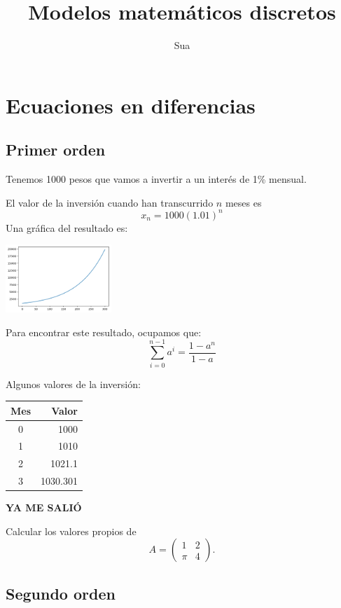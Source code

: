 \documentclass{article}
\title{Modelos matemáticos discretos}
\author{Sua}
\begin{document}
\maketitle
\section{Ecuaciones en diferencias}
\subsection{Primer orden}

Tenemos 1000 pesos que vamos a invertir a un interés de 1\% mensual.

El valor de la inversión cuando han transcurrido $n$ meses es $$x_n=1000(1.01)^n$$
Una gráfica del resultado es:

\begin{center}
\includegraphics[width=4cm]{grafica}
\end{center}

Para encontrar este resultado, ocupamos que: $$\sum_{i=0}^{n-1}a^i=\frac{1-a^n}{1-a}$$

Algunos valores de la inversión:
\begin{center}
\begin{tabular}{|c|r|}
\hline
Mes & Valor \\
\hline
0 & 1000 \\
1 & 1010 \\
2 & 1021.1 \\
3 & 1030.301 \\
\hline
\end{tabular}
\end{center}

\begin{center}
\huge
\textbf{YA ME SALIÓ}
\end{center}

Calcular los valores propios de $$A=
\begin{pmatrix}
1 & 2 \\
\pi & 4
\end{pmatrix}.
$$

\subsection{Segundo orden}
\end{document}
